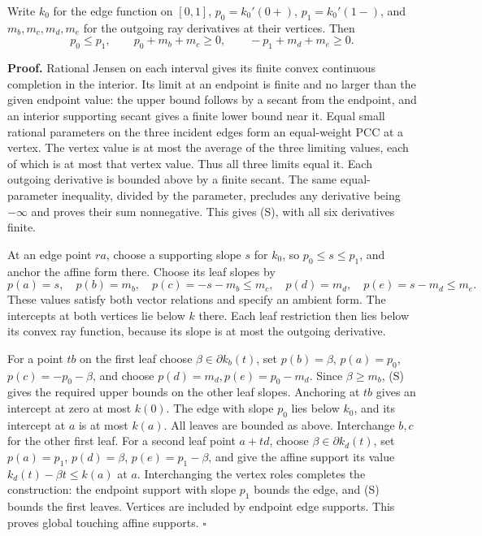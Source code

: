 \documentclass[
  11pt,
]{article}
\begin{document}
Write \(k_0\) for the edge function on \([0,1]\), \(p_0=k_0'(0+)\),
\(p_1=k_0'(1-)\), and \(m_b,m_c,m_d,m_e\) for the outgoing ray
derivatives at their vertices. Then \[
p_0\leq p_1,\qquad p_0+m_b+m_c\geq0,
\qquad -p_1+m_d+m_e\geq0.
\tag{S}
\]

\textbf{Proof.} Rational Jensen on each interval gives its finite convex
continuous completion in the interior. Its limit at an endpoint is
finite and no larger than the given endpoint value: the upper bound
follows by a secant from the endpoint, and an interior supporting secant
gives a finite lower bound near it. Equal small rational parameters on
the three incident edges form an equal-weight PCC at a vertex. The
vertex value is at most the average of the three limiting values, each
of which is at most that vertex value. Thus all three limits equal it.
Each outgoing derivative is bounded above by a finite secant. The same
equal-parameter inequality, divided by the parameter, precludes any
derivative being \(-\infty\) and proves their sum nonnegative. This
gives (S), with all six derivatives finite.

At an edge point \(ra\), choose a supporting slope \(s\) for \(k_0\), so
\(p_0\leq s\leq p_1\), and anchor the affine form there. Choose its leaf
slopes by \[
p(a)=s,\quad p(b)=m_b,\quad p(c)=-s-m_b\leq m_c,
\quad p(d)=m_d,\quad p(e)=s-m_d\leq m_e.
\] These values satisfy both vector relations and specify an ambient
form. The intercepts at both vertices lie below \(k\) there. Each leaf
restriction then lies below its convex ray function, because its slope
is at most the outgoing derivative.

For a point \(tb\) on the first leaf choose \(\beta\in\partial k_b(t)\),
set \(p(b)=\beta\), \(p(a)=p_0\), \(p(c)=-p_0-\beta\), and choose
\(p(d)=m_d,p(e)=p_0-m_d\). Since \(\beta\geq m_b\), (S) gives the
required upper bounds on the other leaf slopes. Anchoring at \(tb\)
gives an intercept at zero at most \(k(0)\). The edge with slope \(p_0\)
lies below \(k_0\), and its intercept at \(a\) is at most \(k(a)\). All
leaves are bounded as above. Interchange \(b,c\) for the other first
leaf. For a second leaf point \(a+td\), choose
\(\beta\in\partial k_d(t)\), set \(p(a)=p_1\),
\(p(d)=\beta\), \(p(e)=p_1-\beta\), and give the affine
support its value \(k_d(t)-\beta t\leq k(a)\) at \(a\).
Interchanging the vertex roles completes the construction: the endpoint
support with slope \(p_1\) bounds the edge, and (S) bounds the first leaves. Vertices are included
by endpoint edge supports. This proves global touching affine supports.
\(\square\)
\end{document}
